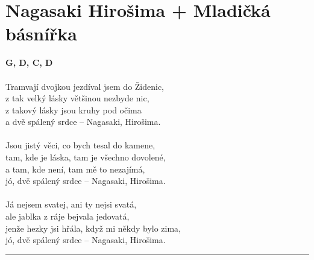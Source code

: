 \section{Nagasaki Hirošima + Mladičká básnířka}
\footnotesize\textbf{G, D, C, D}\\
\\
\normalsize
{}Tramvají dvojkou jezdíval jsem do Židenic,\\
z tak velký lásky většinou nezbyde nic,\\
z takový lásky jsou kruhy pod očima\\
a dvě spálený srdce – Nagasaki, Hirošima.\\
\\
Jsou jistý věci, co bych tesal do kamene,\\
tam, kde je láska, tam je všechno dovolené,\\
a tam, kde není, tam mě to nezajímá,\\
jó, dvě spálený srdce – Nagasaki, Hirošima.\\
\\
Já nejsem svatej, ani ty nejsi svatá,\\
ale jablka z ráje bejvala jedovatá,\\
jenže hezky jsi hřála, když mi někdy bylo zima,\\
jó, dvě spálený srdce – Nagasaki, Hirošima.\\
\noindent\rule{\textwidth}{1pt}\\
\\
